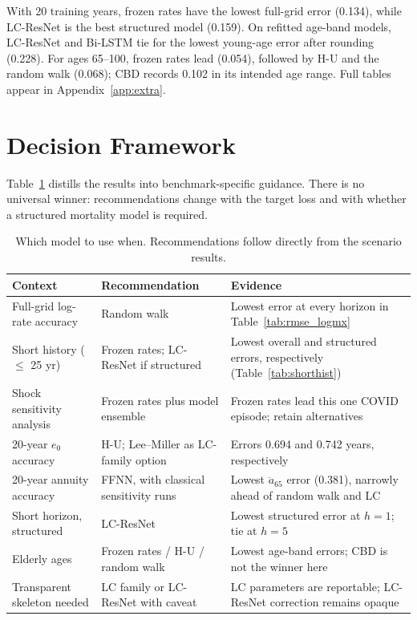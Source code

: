 \documentclass[11pt,a4paper]{article}
\begin{document}
With 20 training years, frozen rates have the lowest full-grid error (0.134), while LC-ResNet is the best structured model (0.159). On refitted age-band models, LC-ResNet and Bi-LSTM tie for the lowest young-age error after rounding (0.228). For ages 65--100, frozen rates lead (0.054), followed by H-U and the random walk (0.068); CBD records 0.102 in its intended age range. Full tables appear in Appendix~\ref{app:extra}.

\section{Decision Framework}
\label{sec:decision}

Table~\ref{tab:decision} distills the results into benchmark-specific guidance. There is no universal winner: recommendations change with the target loss and with whether a structured mortality model is required.

\begin{table}[htbp]
\centering
\caption{Which model to use when. Recommendations follow directly from the scenario results.}
\label{tab:decision}
\small
\begin{tabular}{p{4.6cm} p{3.2cm} p{6.6cm}}
\toprule
Context & Recommendation & Evidence \\
\midrule
Full-grid log-rate accuracy & Random walk & Lowest error at every horizon in Table~\ref{tab:rmse_logmx} \\
Short history ($\le$ 25 yr) & Frozen rates; LC-ResNet if structured & Lowest overall and structured errors, respectively (Table~\ref{tab:shorthist}) \\
Shock sensitivity analysis  & Frozen rates plus model ensemble & Frozen rates lead this one COVID episode; retain alternatives \\
20-year $e_0$ accuracy      & H-U; Lee--Miller as LC-family option & Errors 0.694 and 0.742 years, respectively \\
20-year annuity accuracy    & FFNN, with classical sensitivity runs & Lowest $\ddot a_{65}$ error (0.381), narrowly ahead of random walk and LC \\
Short horizon, structured   & LC-ResNet & Lowest structured error at $h{=}1$; tie at $h{=}5$ \\
Elderly ages                & Frozen rates / H-U / random walk & Lowest age-band errors; CBD is not the winner here \\
Transparent skeleton needed & LC family or LC-ResNet with caveat & LC parameters are reportable; LC-ResNet correction remains opaque \\
\bottomrule
\end{tabular}
\end{table}
\end{document}
